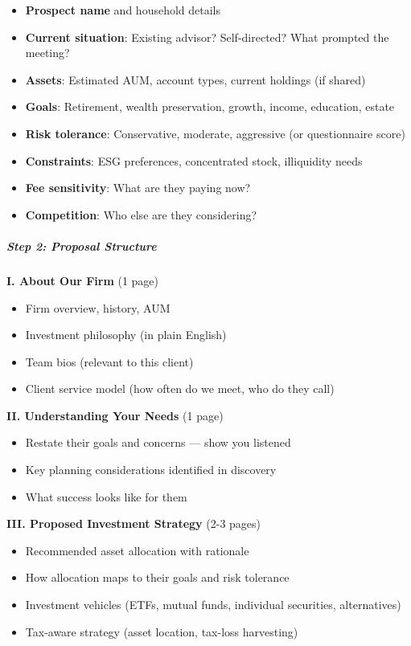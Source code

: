 \documentclass[11pt]{article}
\begin{document}
\begin{itemize}[leftmargin=*,itemsep=2pt,topsep=2pt]
\item {} \textbf{Prospect name} and household details
\item {} \textbf{Current situation}: Existing advisor? Self-directed? What prompted the meeting?
\item {} \textbf{Assets}: Estimated AUM, account types, current holdings (if shared)
\item {} \textbf{Goals}: Retirement, wealth preservation, growth, income, education, estate
\item {} \textbf{Risk tolerance}: Conservative, moderate, aggressive (or questionnaire score)
\item {} \textbf{Constraints}: ESG preferences, concentrated stock, illiquidity needs
\item {} \textbf{Fee sensitivity}: What are they paying now?
\item {} \textbf{Competition}: Who else are they considering?
\end{itemize}

\subparagraph{Step 2: Proposal Structure}\mbox{}\par

\textbf{I. About Our Firm} (1 page)

\begin{itemize}[leftmargin=*,itemsep=2pt,topsep=2pt]
\item {} Firm overview, history, AUM
\item {} Investment philosophy (in plain English)
\item {} Team bios (relevant to this client)
\item {} Client service model (how often do we meet, who do they call)
\end{itemize}

\textbf{II. Understanding Your Needs} (1 page)

\begin{itemize}[leftmargin=*,itemsep=2pt,topsep=2pt]
\item {} Restate their goals and concerns — show you listened
\item {} Key planning considerations identified in discovery
\item {} What success looks like for them
\end{itemize}

\textbf{III. Proposed Investment Strategy} (2-3 pages)

\begin{itemize}[leftmargin=*,itemsep=2pt,topsep=2pt]
\item {} Recommended asset allocation with rationale
\item {} How allocation maps to their goals and risk tolerance
\item {} Investment vehicles (ETFs, mutual funds, individual securities, alternatives)
\item {} Tax-aware strategy (asset location, tax-loss harvesting)
\end{itemize}
\end{document}

